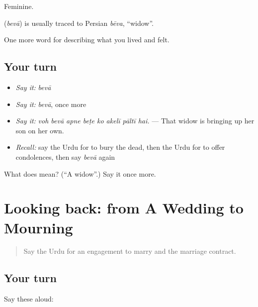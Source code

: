 Feminine.

\begin{cousinweb}
\textbf{} (\emph{bevā}) is usually traced to Persian \emph{bēva}, \textquotedblleft{}widow\textquotedblright{}.
\end{cousinweb}

\begin{grammarlens}[title={What you've built}]
One more word for describing what you lived and felt.
\end{grammarlens}

\subsection*{Your turn}
\begin{itemize}
\raggedright
  \item \emph{Say it:} \emph{bevā}
  \item \emph{Say it:} \emph{bevā}, once more
  \item \emph{Say it:} \emph{voh bevā apne beṭe ko akelī pāltī hai.} — That widow is bringing up her son on her own.
  \item \emph{Recall:} say the Urdu for to bury the dead, then the Urdu for to offer condolences, then say \emph{bevā} again
\end{itemize}

\begin{tcolorbox}[breakable,colback=teal!4,colframe=teal!35!black,title={Before you move on}]
What does  mean? (\textquotedblleft{}A widow\textquotedblright{}.) Say it once more.
\end{tcolorbox}
\section[(dialogue)]{Looking back: from A Wedding to Mourning}

\label{lesson:UR-R493-review-487-493}



\begin{quote}
Say the Urdu for an engagement to marry and the marriage contract.
\end{quote}

\subsection*{Your turn}
Say these aloud:

